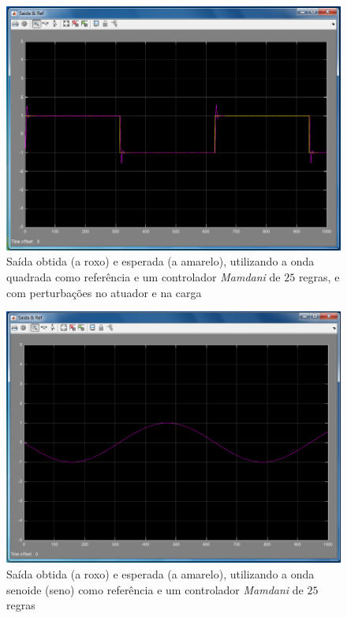 \documentclass{article}
\begin{document}
\begin{figure}[h]
  \centering
      \includegraphics[scale=0.3]{Images/Mamdani_25_square_actuator_charge.png}
  \caption{Saída obtida (a roxo) e esperada (a amarelo), utilizando a onda quadrada como referência e um controlador \emph{Mamdani} de $25$ regras, e com perturbações no atuador e na carga}
\end{figure}


\begin{figure}[h]
  \centering
      \includegraphics[scale=0.3]{Images/Mamdani_25_sin.png}
  \caption{Saída obtida (a roxo) e esperada (a amarelo), utilizando a onda senoide (seno) como referência e um controlador \emph{Mamdani} de $25$ regras}
\end{figure}
\end{document}
